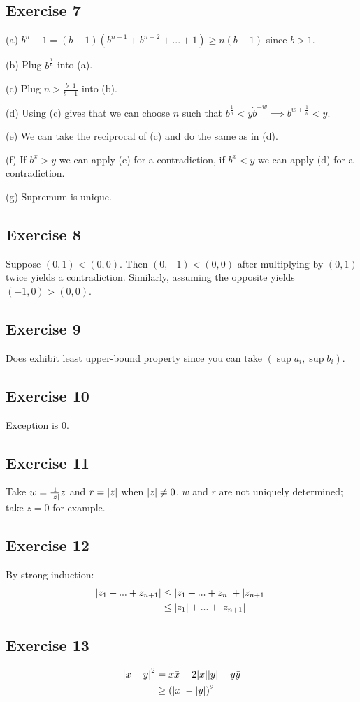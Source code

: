 \subsection{Exercise 7}
(a) $b^n - 1 = (b - 1) (b^{n-1} + b^{n-2} + ... + 1) \geq n (b-1)$ since $b > 1$.

(b) Plug $b^{\frac{1}{n}}$ into (a).

(c) Plug $n > \frac{b_-1}{t-1}$ into (b).

(d) Using (c) gives that we can choose $n$ such that
$b^{\frac{1}{n}} < y \dot b^{-w} \implies b^{w + \frac{1}{n}} < y$.

(e) We can take the reciprocal of (c) and do the same as in (d).

(f) If $b^x > y$ we can apply (e) for a contradiction, if $b^x < y$ we can apply (d)
for a contradiction. 

(g) Supremum is unique.

\subsection{Exercise 8}
Suppose $(0, 1) < (0, 0)$. Then $(0, -1) < (0, 0)$ after multiplying by  $(0, 1)$ twice yields a
contradiction. Similarly, assuming the opposite yields $(-1, 0) > (0, 0)$.

\subsection{Exercise 9}
Does exhibit least upper-bound property since you can take $(\sup{a_i}, \sup{b_i})$.

\subsection{Exercise 10}
Exception is 0.

\subsection{Exercise 11}
Take $w = \frac{1}{\abs{z}}z$ and $r = \abs{z}$ when $\abs{z} \neq 0$. 
$w$ and $r$ are not uniquely determined; take $z = 0$ for example.

\subsection{Exercise 12}
By strong induction:
\begin{align*}
        \abs{z_1 + ... + z_{n+1}} &\leq \abs{z_1 + ... + z_n} + \abs{z_{n+1}} \\
                                  &\leq \abs{z_1} + ... + \abs{z_{n+1}}
\end{align*}

\subsection{Exercise 13}
\begin{align*}
        \abs{x - y}^2 &= x\bar{x} - 2\abs{x}\abs{y} + y \bar{y} \\
                      &\geq (\abs{x} - \abs{y})^2
\end{align*}
